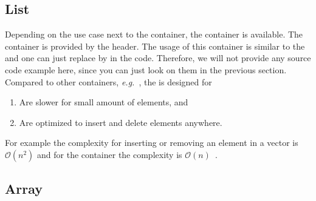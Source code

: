 \subsection{List}
Depending on the use case next to the  container, the  container is available. The  container is provided by the  header. The usage of this container is similar to the  and one can just replace  by  in the code. Therefore, we will not provide any source code example here, since you can just look on them in the previous section. Compared to other containers, \emph{e.g.}\ , the  is designed for
\begin{enumerate}
\item Are slower for small amount of elements, and
\item Are optimized to insert and delete elements anywhere.
\end{enumerate}
For example the complexity for inserting or removing an element in a vector is $\mathcal{O}(n^2)$ and for the container  the complexity is $\mathcal{O}(n)$~\cite{michalewicz2013genetic,knuth1997art}.

\subsection{Array}


